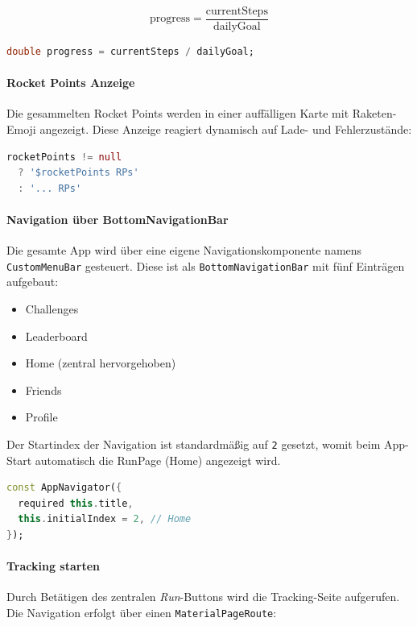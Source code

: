 \documentclass[11pt,a4paper]{article}
\begin{document}
\[
\text{progress} = \frac{\text{currentSteps}}{\text{dailyGoal}}
\]

\begin{lstlisting}[language=Dart, caption=Progressberechnung im StepCounterWidget]
double progress = currentSteps / dailyGoal;
\end{lstlisting}

\paragraph{Rocket Points Anzeige}
Die gesammelten Rocket Points werden in einer auffälligen Karte mit Raketen-Emoji angezeigt. Diese Anzeige reagiert dynamisch auf Lade- und Fehlerzustände:

\begin{lstlisting}[language=Dart]
rocketPoints != null 
  ? '$rocketPoints RPs' 
  : '... RPs'
\end{lstlisting}

\paragraph{Navigation über BottomNavigationBar}
Die gesamte App wird über eine eigene Navigationskomponente namens \texttt{CustomMenuBar} gesteuert. Diese ist als \texttt{BottomNavigationBar} mit fünf Einträgen aufgebaut:

\begin{itemize}
    \item Challenges
    \item Leaderboard
    \item Home (zentral hervorgehoben)
    \item Friends
    \item Profile
\end{itemize}

Der Startindex der Navigation ist standardmäßig auf \texttt{2} gesetzt, womit beim App-Start automatisch die RunPage (Home) angezeigt wird.

\begin{lstlisting}[language=Dart, caption=Initiale Seitenauswahl im AppNavigator]
const AppNavigator({
  required this.title,
  this.initialIndex = 2, // Home
});
\end{lstlisting}

\paragraph{Tracking starten}
Durch Betätigen des zentralen \textit{Run}-Buttons wird die Tracking-Seite aufgerufen. Die Navigation erfolgt über einen \texttt{MaterialPageRoute}:
\end{document}
